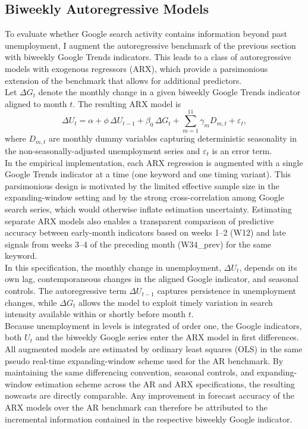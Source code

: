 \documentclass[12pt,a4paper]{article}
\begin{document}
\subsection{Biweekly Autoregressive Models}
To evaluate whether Google search activity contains information beyond past unemployment, I augment the autoregressive benchmark of the previous section with biweekly Google Trends indicators. This leads to a class of autoregressive models with exogenous regressors (ARX), which provide a parsimonious extension of the benchmark that allows for additional predictors.\\
Let $\Delta G_{t}$ denote the monthly change in a given biweekly Google Trends indicator aligned to month $t$. The resulting ARX model is
\begin{equation}
    \Delta U_t 
    = \alpha 
    + \phi \,\Delta U_{t-1}
    + \beta_{0} \,\Delta G_{t} 
    + \sum_{m=1}^{11} \gamma_m D_{m,t}
    + \varepsilon_t,
    \label{eq:arx_main}
\end{equation}
where $D_{m,t}$ are monthly dummy variables capturing deterministic seasonality in the non-seasonally-adjusted unemployment series and $\varepsilon_t$ is an error term.\\
In the empirical implementation, each ARX regression is augmented with a single Google Trends indicator at a time (one keyword and one timing variant). This parsimonious design is motivated by the limited effective sample size in the expanding-window setting and by the strong cross-correlation among Google search series, which would otherwise inflate estimation uncertainty. Estimating separate ARX models also enables a transparent comparison of predictive accuracy between early-month indicators based on weeks 1--2 (W12) and late signals from weeks 3--4 of the preceding month (W34\_prev) for the same keyword.\\
In this specification, the monthly change in unemployment, $\Delta U_t$, depends on its own lag, contemporaneous changes in the aligned Google indicator, and seasonal controls. The autoregressive term $\Delta U_{t-1}$ captures persistence in unemployment changes, while $\Delta G_t$ allows the model to exploit timely variation in search intensity available within or shortly before month $t$.\\
Because unemployment in levels is integrated of order one, the Google indicators, both $U_t$ and the biweekly Google series enter the ARX model in first differences. All augmented models are estimated by ordinary least squares (OLS) in the same pseudo real-time expanding-window scheme used for the AR benchmark. By maintaining the same differencing convention, seasonal controls, and expanding-window estimation scheme across the AR and ARX specifications, the resulting nowcasts are directly comparable. Any improvement in forecast accuracy of the ARX models over the AR benchmark can therefore be attributed to the incremental information contained in the respective biweekly Google indicator.
\end{document}
